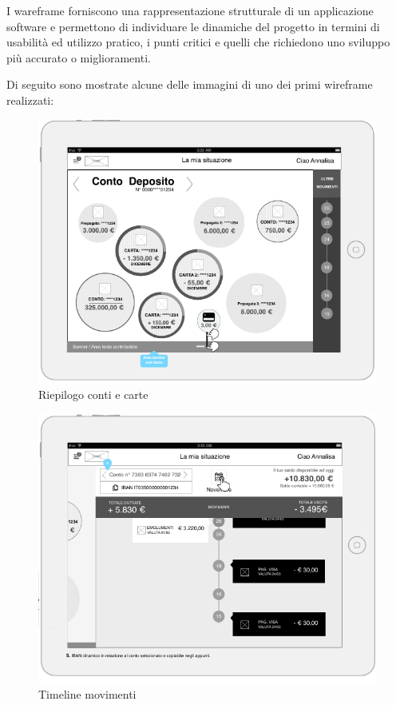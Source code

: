 I wareframe forniscono una rappresentazione strutturale di un applicazione software e permettono di individuare le dinamiche del progetto in termini di usabilità ed utilizzo pratico, i punti critici e quelli che richiedono uno sviluppo più accurato o miglioramenti.

Di seguito sono mostrate alcune delle immagini di uno dei primi wireframe realizzati:

\begin{figure}[!htbp]
\centering
\includegraphics[scale=0.85]{primo_wireframe/miasituazione.png}
\caption{Riepilogo conti e carte}
\end{figure}
\begin{figure}[!htpb]
\centering
\includegraphics[scale=0.85]{primo_wireframe/timeline2.png}
\caption{Timeline movimenti}
\end{figure}
